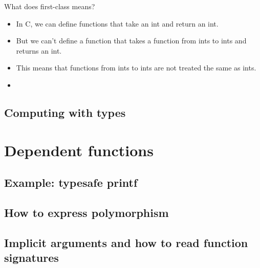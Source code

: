 \documentclass{beamer}
\begin{document}
\begin{frame}{What does first-class means?}
\begin{itemize}
	\item In C, we can define functions that take an int and return an int.
	\item But we can't define a function that takes a function from ints to ints and returns an int.
	\item This means that functions from ints to ints are not treated the same as ints.
	\item 
\end{itemize}
\end{frame}

\subsection{Computing with types}


\section{Dependent functions}


\subsection{Example: typesafe printf}

\subsection{How to express polymorphism}

\subsection{Implicit arguments and how to read function signatures}
\end{document}
